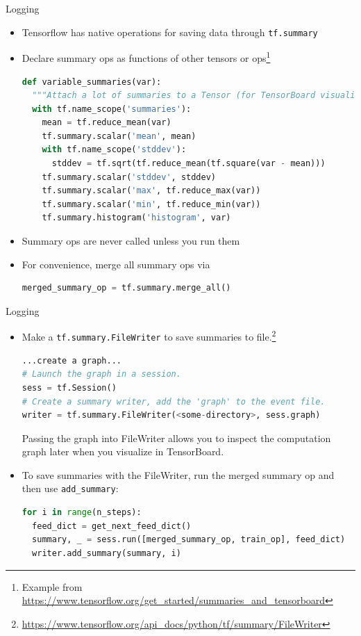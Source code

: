 \documentclass[]{beamer}
\begin{document}
\begin{frame}[fragile]{Logging}

\begin{itemize}
\item Tensorflow has native operations for saving data through \verb|tf.summary|
\item Declare summary ops as functions of other tensors or ops\footnote{Example from \url{https://www.tensorflow.org/get_started/summaries_and_tensorboard}}
\lstset{style=mystyle2}
\begin{lstlisting}[language=python]
def variable_summaries(var):
  """Attach a lot of summaries to a Tensor (for TensorBoard visualization)."""
  with tf.name_scope('summaries'):
    mean = tf.reduce_mean(var)
    tf.summary.scalar('mean', mean)
    with tf.name_scope('stddev'):
      stddev = tf.sqrt(tf.reduce_mean(tf.square(var - mean)))
    tf.summary.scalar('stddev', stddev)
    tf.summary.scalar('max', tf.reduce_max(var))
    tf.summary.scalar('min', tf.reduce_min(var))
    tf.summary.histogram('histogram', var)

\end{lstlisting}
\lstset{style=mystyle}
\item Summary ops are never called unless you run them
\item For convenience, merge all summary ops via
\begin{lstlisting}[language=python]
merged_summary_op = tf.summary.merge_all()
\end{lstlisting}

\end{itemize}
\end{frame}

\begin{frame}[fragile]{Logging}

\begin{itemize}
\item Make a \verb|tf.summary.FileWriter| to save summaries to file.\footnote{\url{https://www.tensorflow.org/api_docs/python/tf/summary/FileWriter}}
\lstset{style=mystyle3}
\begin{lstlisting}[language=python]
...create a graph...
# Launch the graph in a session.
sess = tf.Session()
# Create a summary writer, add the 'graph' to the event file.
writer = tf.summary.FileWriter(<some-directory>, sess.graph)
\end{lstlisting}
\lstset{style=mystyle}
Passing the graph into FileWriter allows you to inspect the computation graph later when you visualize in TensorBoard.
\item To save summaries with the FileWriter, run the merged summary op and then use \verb|add_summary|:
\lstset{style=mystyle3}
\begin{lstlisting}[language=python]
for i in range(n_steps):
  feed_dict = get_next_feed_dict()
  summary, _ = sess.run([merged_summary_op, train_op], feed_dict)
  writer.add_summary(summary, i)
\end{lstlisting}
\end{itemize}

\end{frame}
\end{document}
